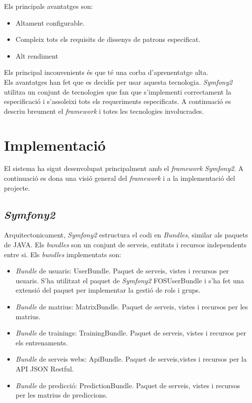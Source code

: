 Els principals avantatges son:
\begin{itemize}
\item Altament configurable.
\item Compleix tots els requisits de dissenys de patrons especificat.
\item Alt rendiment
\end{itemize}

Els principal inconvenients \'{e}s que t\'{e} una corba d'aprenentatge alta.\\

Els avantatges han fet que es decidís per usar aquesta tecnologia. \textit{Symfony2} utilitza un conjunt de tecnologies que fan que s'implementi correctament la especificació i s'assoleixi tots els requeriments especificats. A continuació es descriu breument el \textit{framework} i totes les tecnologies involucrades.

\section{Implementaci\'{o}}
El sistema ha sigut desenvolupat principalment amb el \textit{framework} \textit{Symfony2}. A continuaci\'{o} es dona una visi\'{o} general del \textit{framework} i a la implementació del projecte.

\subsection{\textit{Symfony2}}
Arquitectonicament, \textit{Symfony2} estructura el codi en \textit{Bundles}, similar als paquets de JAVA. Els \textit{bundles} son un conjunt de serveis, entitats i recursos independents entre si. Els \textit{bundles} implementats son:
\begin{itemize}
\item \textit{Bundle} de usuaris: UserBundle. Paquet de serveis, vistes i recursos per usuaris. S'ha utilitzat el paquet de \textit{Symfony2} FOSUserBundle \cite{fosuserbundle} i s'ha fet una extensi\'{o} del paquet per implementar la gesti\'{o} de rols i grups. 
\item \textit{Bundle} de matrius: MatrixBundle. Paquet de serveis, vistes i recursos per les matrius.
\item \textit{Bundle} de trainings: TrainingBundle. Paquet de serveis, vistes i recursos per els entrenaments.
\item \textit{Bundle} de serveis webs: ApiBundle. Paquet de serveis,vistes i recursos per la API JSON Restful. 
\item \textit{Bundle} de predicci\'{o}: PredictionBundle. Paquet de serveis, vistes i recursos per les matrius de prediccions.
\end{itemize}

